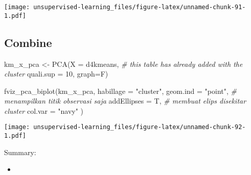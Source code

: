 \documentclass[
]{article}
\newenvironment{Shaded}{\begin{snugshade}}{\end{snugshade}}
\newcommand{\AttributeTok}[1]{\textcolor[rgb]{0.77,0.63,0.00}{#1}}
\newcommand{\CommentTok}[1]{\textcolor[rgb]{0.56,0.35,0.01}{\textit{#1}}}
\newcommand{\DecValTok}[1]{\textcolor[rgb]{0.00,0.00,0.81}{#1}}
\newcommand{\FunctionTok}[1]{\textcolor[rgb]{0.00,0.00,0.00}{#1}}
\newcommand{\NormalTok}[1]{#1}
\newcommand{\OtherTok}[1]{\textcolor[rgb]{0.56,0.35,0.01}{#1}}
\newcommand{\StringTok}[1]{\textcolor[rgb]{0.31,0.60,0.02}{#1}}
\providecommand{\tightlist}{%
  \setlength{\itemsep}{0pt}\setlength{\parskip}{0pt}}
\begin{document}
\texttt{[image: unsupervised-learning\_files/figure-latex/unnamed-chunk-91-1.pdf]}

\hypertarget{combine}{%
\subsection{Combine}\label{combine}}

\begin{Shaded}
\begin{Highlighting}[]
\NormalTok{km\_x\_pca }\OtherTok{\textless{}{-}} \FunctionTok{PCA}\NormalTok{(}\AttributeTok{X =}\NormalTok{ d4kmeans, }\CommentTok{\# this table has already added with the cluster}
               \AttributeTok{quali.sup =} \DecValTok{10}\NormalTok{, }
               \AttributeTok{graph=}\NormalTok{F) }

\FunctionTok{fviz\_pca\_biplot}\NormalTok{(km\_x\_pca,}
                \AttributeTok{habillage =} \StringTok{"cluster"}\NormalTok{,}
                \AttributeTok{geom.ind =} \StringTok{"point"}\NormalTok{, }\CommentTok{\# menampilkan titik observasi saja}
                \AttributeTok{addEllipses =}\NormalTok{ T, }\CommentTok{\# membuat elips disekitar cluster}
                \AttributeTok{col.var =} \StringTok{"navy"}
\NormalTok{)}
\end{Highlighting}
\end{Shaded}

\texttt{[image: unsupervised-learning\_files/figure-latex/unnamed-chunk-92-1.pdf]}

Summary:

\begin{itemize}
\tightlist
\item
\end{itemize}
\end{document}
